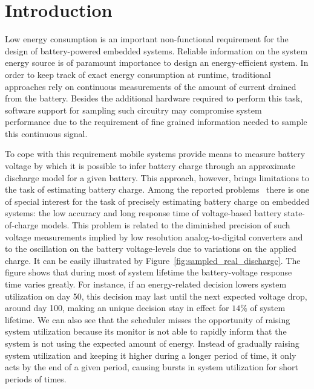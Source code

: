 \section{Introduction}
\label{sec:intro}

Low energy consumption is an important non-functional requirement for the design
of battery-powered embedded systems. Reliable information on the system energy
source is of paramount importance to design an energy-efficient system.
In order to keep track of exact energy consumption at runtime, traditional
approaches rely on continuous measurements of the amount of current drained from
the battery. Besides the additional hardware required to perform this task,
software support for sampling such circuitry may compromise system performance
due to the requirement of fine grained information needed to sample this
continuous signal.


To cope with this requirement mobile systems provide means to measure battery
voltage by which it is possible to infer battery charge through an approximate
discharge model for a given battery. This approach, however, brings limitations
to the task of estimating battery charge.
Among the reported problems~\cite{Mundra:2008,Penella:2010} there is one of
special interest for the task of precisely estimating battery charge on
embedded systems: the low accuracy and long response time of voltage-based
battery state-of-charge models. This problem is related to the diminished
precision of such voltage measurements implied by low resolution
analog-to-digital converters and to the oscillation on the battery voltage-levels
due to variations on the applied charge. It can be easily illustrated by
Figure~\ref{fig:sampled_real_discharge}. The figure shows that during most of
system lifetime the battery-voltage response time varies greatly. For instance,
if an energy-related decision lowers system utilization on day 50, this decision
may last until the next expected voltage drop, around day 100, making an unique
decision stay in effect for $14\%$ of system lifetime. We can also see that the
scheduler misses the opportunity of raising system utilization because its
monitor is not able to rapidly inform that the system is not using the expected
amount of energy. Instead of gradually raising system utilization and keeping it
higher during a longer period of time, it only acts by the end of a given
period, causing bursts in system utilization for short periods of times.

